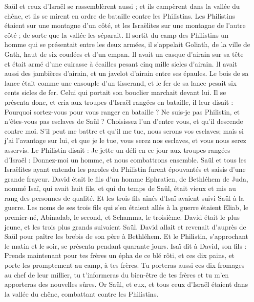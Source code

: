 \begin{multicols}{2}
Saül et ceux d'Israël se rassemblèrent aussi ; et ils campèrent dans la vallée du chêne, et ils se mirent en ordre de bataille contre les Philistins.
Les Philistins étaient sur une montagne d'un côté, et les Israëlites sur une montagne de l'autre côté ; de sorte que la vallée les séparait.
Il sortit du camp des Philistins un homme qui se présentait entre les deux armées, il s'appelait Goliath, de la ville de Gath, haut de six coudées et d'un empan.
Il avait un casque d'airain sur sa tête et était armé d'une cuirasse à écailles pesant cinq mille sicles d'airain.
Il avait aussi des jambières d'airain, et un javelot d'airain entre ses épaules.
Le bois de sa lance était comme une ensouple d'un tisserand, et le fer de sa lance pesait six cents sicles de fer. Celui qui portait son bouclier marchait devant lui.
Il se présenta donc, et cria aux troupes d'Israël rangées en bataille, il leur disait : Pourquoi sortez-vous pour vous ranger en bataille ? Ne suis-je pas Philistin, et n'êtes-vous pas esclaves de Saül ? Choisissez l'un d'entre vous, et qu'il descende contre moi.
S'il peut me battre et qu'il me tue, nous serons vos esclaves; mais si j'ai l'avantage sur lui, et que je le tue, vous serez nos esclaves, et vous nous serez asservis.
Le Philistin disait : Je jette un défi en ce jour aux troupes rangées d'Israël : Donnez-moi un homme, et nous combattrons ensemble.
Saül et tous les Israëlites ayant entendu les paroles du Philistin furent épouvantés et saisis d'une grande frayeur.
David était le fils d'un homme Ephratien, de Bethléhem de Juda, nommé Isaï, qui avait huit fils, et qui du temps de Saül, était vieux et mis au rang des personnes de qualité.
Et les trois fils aînés d'Isaï avaient suivi Saül à la guerre. Les noms de ses trois fils qui s'en étaient allés à la guerre étaient Eliab, le premier-né, Abinadab, le second, et Schamma, le troisième.
David était le plus jeune, et les trois plus grands suivaient Saül.
David allait et revenait d'auprès de Saül pour paître les brebis de son père à Bethléhem.
Et le Philistin, s'approchant le matin et le soir, se présenta pendant quarante jours.
Isaï dit à David, son fils : Prends maintenant pour tes frères un épha de ce blé rôti, et ces dix pains, et porte-les promptement au camp, à tes frères.
Tu porteras aussi ces dix fromages au chef de leur millier, tu t'informeras du bien-être de tes frères et tu m'en apporteras des nouvelles sûres.
Or Saül, et eux, et tous ceux d'Israël étaient dans la vallée du chêne, combattant contre les Philistins.

\end{multicols}
